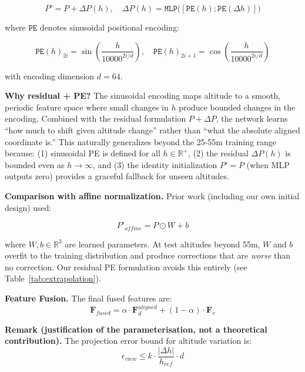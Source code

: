 \documentclass[9.5pt,twocolumn,a4paper]{IEEEtran}
\def\mb#1{\mathbf{#1}}
\def\msc#1{\texttt{#1}}
\begin{document}
\begin{equation}
    P' = P + \Delta P(h), \quad
    \Delta P(h) = \msc{MLP}\big([\msc{PE}(h); \msc{PE}(\Delta h)]\big)
    \label{eq:residual_correction}
\end{equation}

where $\msc{PE}$ denotes sinusoidal positional encoding:

\begin{equation}
    \msc{PE}(h)_{2i} = \sin\left(\frac{h}{10000^{2i/d}}\right), \quad
    \msc{PE}(h)_{2i+1} = \cos\left(\frac{h}{10000^{2i/d}}\right)
    \label{eq:altitude_pe}
\end{equation}

with encoding dimension $d=64$.

\textbf{Why residual + PE?} The sinusoidal encoding maps altitude to a smooth, periodic feature space where small changes in $h$ produce bounded changes in the encoding. Combined with the residual formulation $P + \Delta P$, the network learns ``how much to shift given altitude change'' rather than ``what the absolute aligned coordinate is.'' This naturally generalizes beyond the 25-55m training range because: (1) sinusoidal PE is defined for all $h \in \mathbb{R}^+$, (2) the residual $\Delta P(h)$ is bounded even as $h \rightarrow \infty$, and (3) the identity initialization $P' = P$ (when MLP outputs zero) provides a graceful fallback for unseen altitudes.

\textbf{Comparison with affine normalization.} Prior work (including our own initial design) used:

\begin{equation}
    P'_{affine} = P \odot W + b
    \label{eq:affine_baseline}
\end{equation}

where $W, b \in \mathbb{R}^3$ are learned parameters. At test altitudes beyond 55m, $W$ and $b$ overfit to the training distribution and produce corrections that are \emph{worse} than no correction. Our residual PE formulation avoids this entirely (see Table~\ref{tab:extrapolation}).

\textbf{Feature Fusion.} The final fused features are:
\begin{equation}
    \mb{F}_{fused} = \alpha \cdot \mb{F}_d^{aligned} + (1-\alpha) \cdot \mb{F}_v
    \label{eq:adaptive_fusion}
\end{equation}

\textbf{Remark (justification of the parameterisation, not a theoretical contribution).} The projection error bound for altitude variation is:
\begin{equation}
    \epsilon_{view} \leq k \cdot \frac{|\Delta h|}{h_{ref}} \cdot d
    \label{eq:altitude_error_bound}
\end{equation}
\end{document}
